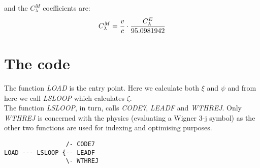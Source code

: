 and the $C_\lambda^{M}$ coefficients are:\\

\begin{equation}
C_\lambda^M = {v \over c} \cdot {C_\lambda^E \over 95.0981942}
\end{equation}

\section{The code}

The function \emph{LOAD} is the entry point. Here we calculate both $\xi$ and
$\psi$ and from here we call \emph{LSLOOP} which calculates $\zeta$.\\

The function \emph{LSLOOP}, in turn, calls \emph{CODE7}, \emph{LEADF} and \emph{
WTHREJ}. Only \emph{WTHREJ} is concerned with the physics (evaluating a
Wigner 3-j symbol) as the other two functions are used for indexing and
optimising purposes.\\

\begin{verbatim}
                 /- CODE7
LOAD --- LSLOOP {-- LEADF
                 \- WTHREJ
\end{verbatim}
